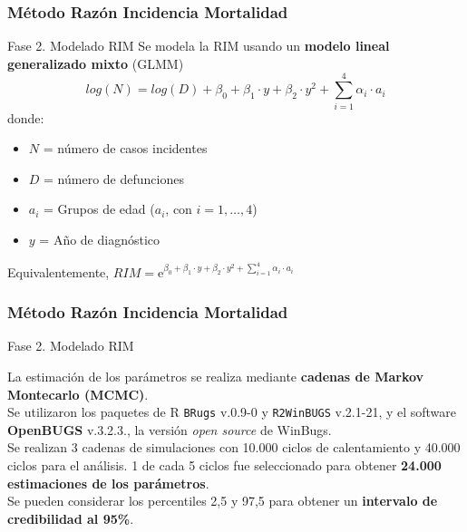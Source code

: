 \documentclass{beamer}
\begin{document}

\begin{frame}\frametitle{Método Razón Incidencia Mortalidad}

	\begin{block}{Fase 2. Modelado RIM}
		Se modela la RIM usando un \textbf{modelo lineal generalizado mixto} (GLMM)
		$$log(N) =  log(D) + \beta_0 + \beta_1 \cdot y + \beta_2 \cdot y^2  + \sum_{i = 1}^{4} \alpha_i \cdot a_i $$ donde:
		\begin{itemize}
			\item $N$ = número de casos incidentes 
			\item $D$ = número de defunciones 
			\item $a_i$ = Grupos de edad ($a_i$, con $i = 1, \hdots, 4$)
			\item $y$ = Año de diagnóstico
		\end{itemize}
	
	\vspace{10pt}
	Equivalentemente, $RIM = \mathrm e^{\beta_0 + \beta_1 \cdot y + \beta_2 \cdot y^2 + \sum_{i = 1}^{4} \alpha_i \cdot a_i} $

	\end{block}
\end{frame}


\begin{frame}\frametitle{Método Razón Incidencia Mortalidad}
	\begin{block}{Fase 2. Modelado RIM}
		
		La estimación de los parámetros se realiza mediante \textbf{cadenas de Markov Montecarlo (MCMC)}.\\[2ex]
		
		Se utilizaron los paquetes de R \texttt{BRugs} v.0.9-0 y \texttt{R2WinBUGS} v.2.1-21, y el software \textbf{OpenBUGS} v.3.2.3., la versión \textit{open source} de WinBugs.\\[2ex]
		
		Se realizan 3 cadenas de simulaciones con 10.000 ciclos de calentamiento y 40.000 ciclos para el análisis. 1 de cada 5 ciclos fue seleccionado para obtener \textbf{24.000 estimaciones de los parámetros}.\\[2ex]
		
	Se pueden considerar los percentiles 2,5 y 97,5 para obtener un \textbf{intervalo de credibilidad al 95\%}.\\
		
	\end{block}

\end{frame}
\end{document}
